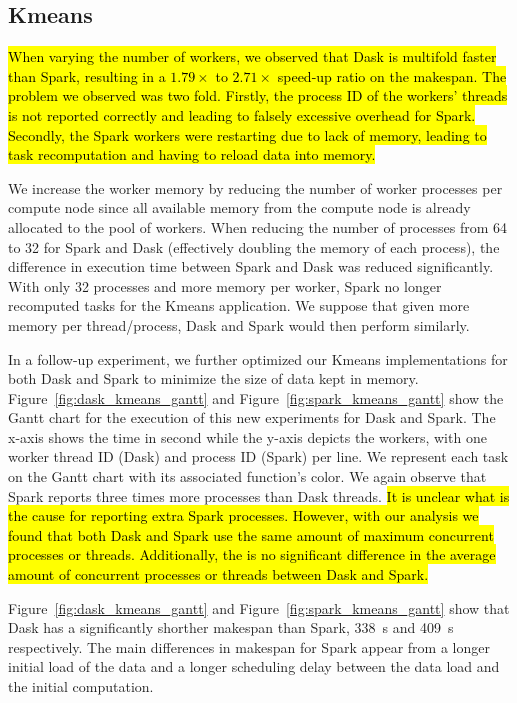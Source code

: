 \documentclass[AMA,STIX1COL]{WileyNJD-v2}
\newcommand{\HL}[1]{\hl{#1}}
\begin{document}
\subsection{Kmeans}
\HL{
	When varying the number of workers, we observed that Dask is multifold faster
	than Spark, resulting in a $1.79\times$ to $2.71\times$ speed-up ratio on the makespan.
	The problem we observed was two fold.
	Firstly, the process ID of the workers' threads is not reported correctly and 
	leading to falsely excessive overhead for Spark.
	Secondly, the Spark workers were restarting due to lack of memory, leading 
	to task recomputation and having to reload data into memory.
}
							
We increase the worker memory by reducing the number of worker processes per
compute node since all available memory from the compute node is already allocated to the pool of workers.
When reducing the number of processes from 64 to 32 for Spark and Dask 
(effectively doubling the memory of each process), the difference in execution time between Spark and Dask was reduced significantly.
With only 32 processes and more memory per worker, Spark no longer recomputed tasks for the Kmeans application.
We suppose that given more memory per thread/process, Dask and Spark would then perform similarly.
							
In a follow-up experiment, we further optimized our Kmeans implementations for both Dask and Spark to minimize the size of data kept in memory.
Figure~{\ref{fig:dask_kmeans_gantt}} and Figure~{\ref{fig:spark_kmeans_gantt}} show the Gantt chart for the execution
of this new experiments for Dask and Spark.
The x-axis shows the time in second while the y-axis depicts the workers, with 
one worker thread ID (Dask) and process ID (Spark) per line.
We represent each task on the Gantt chart with its associated function's color.
We again observe that Spark reports three times more processes than Dask threads.
\HL{
	It is unclear what is the cause for reporting extra Spark processes.
	However, with our analysis we found that both Dask and Spark use the same 
	amount of maximum concurrent processes or threads.
	Additionally, the is no significant difference in the average amount of 
	concurrent processes or threads between Dask and Spark.
}
							
Figure~{\ref{fig:dask_kmeans_gantt}} and Figure~{\ref{fig:spark_kmeans_gantt}}
show that Dask has a significantly shorther makespan than Spark, {\SI{338}{\second}}
and {\SI{409}{\second}} respectively.
The main differences in makespan for Spark appear from a longer initial load of the data
and a longer scheduling delay between the data load and the initial computation.
							
\end{document}
